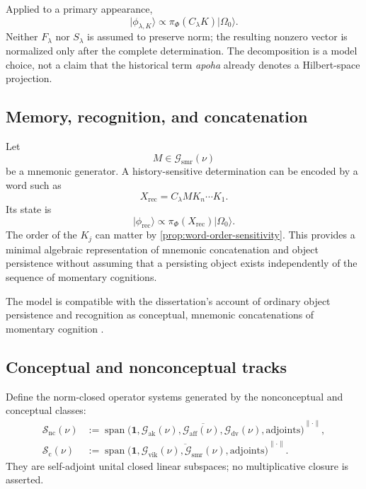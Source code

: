 \documentclass[11pt,reqno]{scrartcl}
\newcommand{\piF}{\pi_{\Phi}}
\newcommand{\idop}{\mathbf 1}
\newcommand{\ket}[1]{\lvert #1\rangle}
\DeclareMathOperator{\Span}{span}
\newcommand{\vas}{\nu}
\newcommand{\Gak}{\mathcal G_{\mathrm{ak}}}
\newcommand{\Gvik}{\mathcal G_{\mathrm{vik}}}
\newcommand{\Gsmr}{\mathcal G_{\mathrm{smr}}}
\newcommand{\Gaff}{\mathcal G_{\mathrm{aff}}}
\newcommand{\Gdv}{\mathcal G_{\mathrm{dv}}}
\theoremstyle{plain}
\theoremstyle{definition}
\theoremstyle{remark}
\begin{document}
Applied to a primary appearance,
\begin{equation}
  \ket{\phi_{\lambda,K}}
  \propto
  \piF(C_{\lambda}K)\ket{\Omega_0}.
  \label{eq:conceptually-determined-appearance}
\end{equation}
Neither $F_{\lambda}$ nor $S_{\lambda}$ is assumed to preserve norm; the
resulting nonzero vector is normalized only after the complete determination.
The decomposition is a model choice, not a claim that the historical term
\emph{apoha} already denotes a Hilbert-space projection.

\subsection{Memory, recognition, and concatenation}

Let
\begin{equation}
  M\in\Gsmr(\vas)
\end{equation}
be a mnemonic generator.  A history-sensitive determination can be encoded
by a word such as
\begin{equation}
  X_{\mathrm{rec}}
  =C_{\lambda}M K_n\cdots K_1.
  \label{eq:recognition-word}
\end{equation}
Its state is
\begin{equation}
  \ket{\phi_{\mathrm{rec}}}
  \propto
  \piF(X_{\mathrm{rec}})\ket{\Omega_0}.
  \label{eq:recognition-state}
\end{equation}
The order of the $K_j$ can matter by
\cref{prop:word-order-sensitivity}.  This provides a minimal algebraic
representation of mnemonic concatenation and object persistence without
assuming that a persisting object exists independently of the sequence of
momentary cognitions.

The model is compatible with the dissertation's account of ordinary object
persistence and recognition as conceptual, mnemonic concatenations of
momentary cognition \cite[pp.~107--128]{Yiannopoulos2020}.

\subsection{Conceptual and nonconceptual tracks}

Define the norm-closed operator systems generated by the nonconceptual and
conceptual classes:
\begin{align}
  \mathcal S_{\mathrm{nc}}(\vas)
  &:=\overline{\Span\bigl(
      \idop,\Gak(\vas),\Gaff(\vas),\Gdv(\vas),
      \text{adjoints}
    \bigr)}^{\|\cdot\|},
  \label{eq:nonconceptual-operator-system}\\
  \mathcal S_{\mathrm{c}}(\vas)
  &:=\overline{\Span\bigl(
      \idop,\Gvik(\vas),\Gsmr(\vas),
      \text{adjoints}
    \bigr)}^{\|\cdot\|}.
  \label{eq:conceptual-operator-system}
\end{align}
They are self-adjoint unital closed linear subspaces; no multiplicative
closure is asserted.
\end{document}
